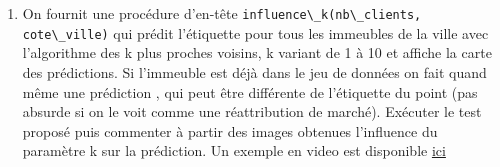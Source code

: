 \documentclass[
  11pt,
]{article}
\newcommand{\passthrough}[1]{#1}
\providecommand{\tightlist}{%
  \setlength{\itemsep}{0pt}\setlength{\parskip}{0pt}}
\newcounter{thme}
\newcounter{prop}
\newcounter{def}
\newcounter{alg}
\begin{document}
\begin{enumerate}
\def\labelenumi{\arabic{enumi}.}
\setcounter{enumi}{6}
\tightlist
\item
  On fournit une procédure d'en-tête
  \passthrough{\lstinline!influence\_k(nb\_clients,  cote\_ville)!} qui
  prédit l'étiquette pour tous les immeubles de la ville avec
  l'algorithme des k plus proches voisins, k variant de 1 à 10 et
  affiche la carte des prédictions. Si l'immeuble est déjà dans le jeu
  de données on fait quand même une prédiction , qui peut être
  différente de l'étiquette du point (pas absurde si on le voit comme
  une réattribution de marché). Exécuter le test proposé puis commenter
  à partir des images obtenues l'influence du paramètre k sur la
  prédiction. Un exemple en video est disponible
  \href{\%5Bimages/KNN-Influence-de-k.gif\%5D(https://nuage03.apps.education.fr/index.php/s/Re7CtAHmEN4yTy3)}{ici}
\end{enumerate}
\end{document}
